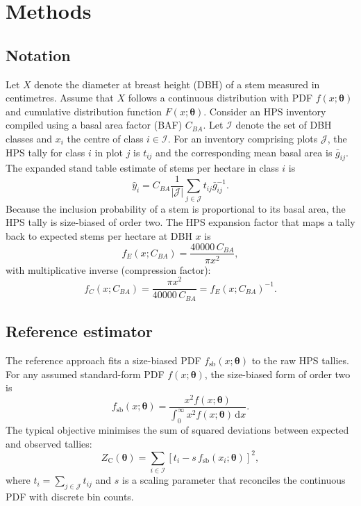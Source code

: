 \section{Methods}
\label{sec:methods}

\subsection{Notation}
Let $X$ denote the diameter at breast height (DBH) of a stem measured in
centimetres. Assume that $X$ follows a continuous distribution with PDF
$f(x;\boldsymbol{\theta})$ and cumulative distribution function
$F(x;\boldsymbol{\theta})$. Consider an HPS inventory compiled using a basal
area factor (BAF) $C_{BA}$. Let $\mathcal{I}$ denote the set of DBH classes and
$x_i$ the centre of class $i \in \mathcal{I}$. For an inventory comprising
plots $\mathcal{J}$, the HPS tally for class $i$ in plot $j$ is $t_{ij}$ and
the corresponding mean basal area is $\bar{g}_{ij}$. The expanded stand table
estimate of stems per hectare in class $i$ is
\begin{equation}
  \hat{y}_i = C_{BA} \frac{1}{|\mathcal{J}|} \sum_{j \in \mathcal{J}} t_{ij} \bar{g}_{ij}^{-1}.
  \label{eq:stand-table}
\end{equation}
Because the inclusion probability of a stem is proportional to its basal area,
the HPS tally is size-biased of order two. The HPS expansion factor that maps a
tally back to expected stems per hectare at DBH $x$ is
\begin{equation}
  f_E(x; C_{BA}) = \frac{40000 \, C_{BA}}{\pi x^2},
  \label{eq:expansion}
\end{equation}
with multiplicative inverse (compression factor):
\begin{equation}
  f_C(x; C_{BA}) = \frac{\pi x^2}{40000 \, C_{BA}} = f_E(x; C_{BA})^{-1}.
  \label{eq:compression}
\end{equation}

\subsection{Reference estimator}
The reference approach \citep{van1986, ducey2015} fits a size-biased PDF
$f_{\text{sb}}(x; \boldsymbol{\theta})$ to the raw HPS tallies. For any assumed
standard-form PDF $f(x; \boldsymbol{\theta})$, the size-biased form of order
two is
\begin{equation}
  f_{\text{sb}}(x; \boldsymbol{\theta}) =
  \frac{x^2 f(x; \boldsymbol{\theta})}{\int_0^\infty x^2 f(x; \boldsymbol{\theta}) \, \mathrm{d}x}.
  \label{eq:size-biased}
\end{equation}
The typical objective minimises the sum of squared deviations between expected
and observed tallies:
\begin{equation}
  Z_{\text{C}}(\boldsymbol{\theta}) =
  \sum_{i \in \mathcal{I}} \left[t_i - s \, f_{\text{sb}}(x_i; \boldsymbol{\theta})\right]^2,
  \label{eq:control-obj}
\end{equation}
where $t_i = \sum_{j \in \mathcal{J}} t_{ij}$ and $s$ is a scaling parameter
that reconciles the continuous PDF with discrete bin counts.

